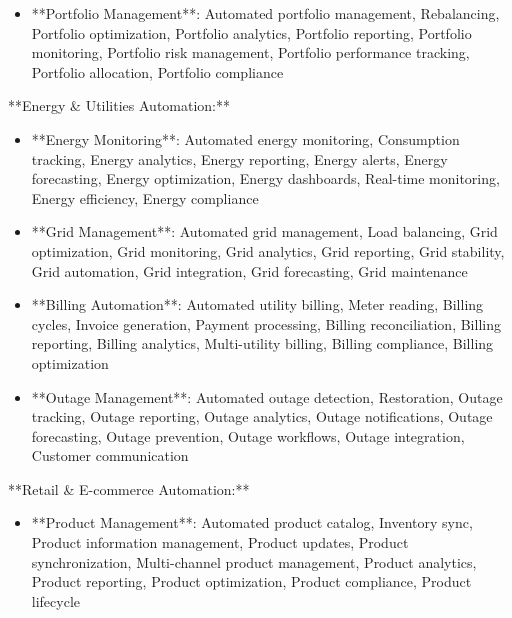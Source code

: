 \documentclass[11pt,a4paper]{article}
\begin{document}
\begin{itemize}
\item **Portfolio Management**: Automated portfolio management, Rebalancing, Portfolio optimization, Portfolio analytics, Portfolio reporting, Portfolio monitoring, Portfolio risk management, Portfolio performance tracking, Portfolio allocation, Portfolio compliance
\end{itemize}

**Energy \& Utilities Automation:**

\begin{itemize}
\item **Energy Monitoring**: Automated energy monitoring, Consumption tracking, Energy analytics, Energy reporting, Energy alerts, Energy forecasting, Energy optimization, Energy dashboards, Real-time monitoring, Energy efficiency, Energy compliance
\end{itemize}

\begin{itemize}
\item **Grid Management**: Automated grid management, Load balancing, Grid optimization, Grid monitoring, Grid analytics, Grid reporting, Grid stability, Grid automation, Grid integration, Grid forecasting, Grid maintenance
\end{itemize}

\begin{itemize}
\item **Billing Automation**: Automated utility billing, Meter reading, Billing cycles, Invoice generation, Payment processing, Billing reconciliation, Billing reporting, Billing analytics, Multi-utility billing, Billing compliance, Billing optimization
\end{itemize}

\begin{itemize}
\item **Outage Management**: Automated outage detection, Restoration, Outage tracking, Outage reporting, Outage analytics, Outage notifications, Outage forecasting, Outage prevention, Outage workflows, Outage integration, Customer communication
\end{itemize}

**Retail \& E-commerce Automation:**

\begin{itemize}
\item **Product Management**: Automated product catalog, Inventory sync, Product information management, Product updates, Product synchronization, Multi-channel product management, Product analytics, Product reporting, Product optimization, Product compliance, Product lifecycle
\end{itemize}
\end{document}
